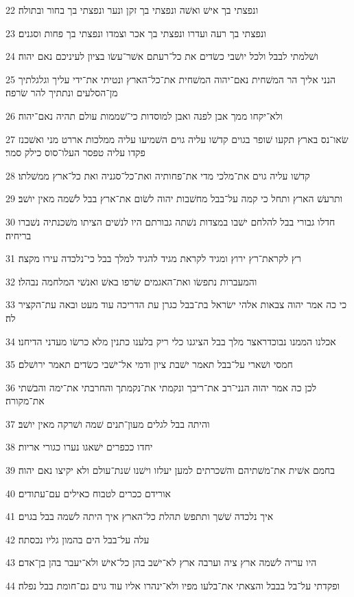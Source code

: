 \par 22 ונפצתי בך אישׁ ואשׁה ונפצתי בך זקן ונער ונפצתי בך בחור ובתולה׃
\par 23 ונפצתי בך רעה ועדרו ונפצתי בך אכר וצמדו ונפצתי בך פחות וסגנים׃
\par 24 ושׁלמתי לבבל ולכל יושׁבי כשׂדים את כל־רעתם אשׁר־עשׂו בציון לעיניכם נאם יהוה׃
\par 25 הנני אליך הר המשׁחית נאם־יהוה המשׁחית את־כל־הארץ ונטיתי את־ידי עליך וגלגלתיך מן־הסלעים ונתתיך להר שׂרפה׃
\par 26 ולא־יקחו ממך אבן לפנה ואבן למוסדות כי־שׁממות עולם תהיה נאם־יהוה׃
\par 27 שׂאו־נס בארץ תקעו שׁופר בגוים קדשׁו עליה גוים השׁמיעו עליה ממלכות אררט מני ואשׁכנז פקדו עליה טפסר העלו־סוס כילק סמר׃
\par 28 קדשׁו עליה גוים את־מלכי מדי את־פחותיה ואת־כל־סגניה ואת כל־ארץ ממשׁלתו׃
\par 29 ותרעשׁ הארץ ותחל כי קמה על־בבל מחשׁבות יהוה לשׂום את־ארץ בבל לשׁמה מאין יושׁב׃
\par 30 חדלו גבורי בבל להלחם ישׁבו במצדות נשׁתה גבורתם היו לנשׁים הציתו משׁכנתיה נשׁברו בריחיה׃
\par 31 רץ לקראת־רץ ירוץ ומגיד לקראת מגיד להגיד למלך בבל כי־נלכדה עירו מקצה׃
\par 32 והמעברות נתפשׂו ואת־האגמים שׂרפו באשׁ ואנשׁי המלחמה נבהלו׃
\par 33 כי כה אמר יהוה צבאות אלהי ישׂראל בת־בבל כגרן עת הדריכה עוד מעט ובאה עת־הקציר לה׃
\par 34 אכלנו הממנו נבוכדראצר מלך בבל הציגנו כלי ריק בלענו כתנין מלא כרשׂו מעדני הדיחנו׃
\par 35 חמסי ושׁארי על־בבל תאמר ישׁבת ציון ודמי אל־ישׁבי כשׂדים תאמר ירושׁלם׃
\par 36 לכן כה אמר יהוה הנני־רב את־ריבך ונקמתי את־נקמתך והחרבתי את־ימה והבשׁתי את־מקורה׃
\par 37 והיתה בבל לגלים מעון־תנים שׁמה ושׁרקה מאין יושׁב׃
\par 38 יחדו ככפרים ישׁאגו נערו כגורי אריות׃
\par 39 בחמם אשׁית את־משׁתיהם והשׁכרתים למען יעלזו וישׁנו שׁנת־עולם ולא יקיצו נאם יהוה׃
\par 40 אורידם ככרים לטבוח כאילים עם־עתודים׃
\par 41 איך נלכדה שׁשׁך ותתפשׂ תהלת כל־הארץ איך היתה לשׁמה בבל בגוים׃
\par 42 עלה על־בבל הים בהמון גליו נכסתה׃
\par 43 היו עריה לשׁמה ארץ ציה וערבה ארץ לא־ישׁב בהן כל־אישׁ ולא־יעבר בהן בן־אדם׃
\par 44 ופקדתי על־בל בבבל והצאתי את־בלעו מפיו ולא־ינהרו אליו עוד גוים גם־חומת בבל נפלה׃
